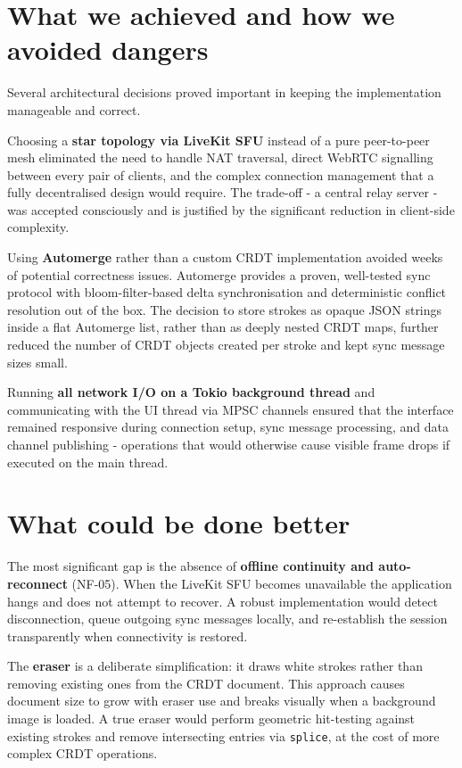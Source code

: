 \documentclass[a4paper,11pt,twoside]{report}
\theoremstyle{definition}
\begin{document}
\section{What we achieved and how we avoided dangers}

Several architectural decisions proved important in keeping the implementation manageable
and correct.

Choosing a \textbf{star topology via LiveKit SFU} instead of a pure peer-to-peer mesh
eliminated the need to handle NAT traversal, direct WebRTC signalling between every pair
of clients, and the complex connection management that a fully decentralised design would
require. The trade-off - a central relay server - was accepted consciously and is
justified by the significant reduction in client-side complexity.

Using \textbf{Automerge} rather than a custom CRDT implementation avoided weeks of
potential correctness issues. Automerge provides a proven, well-tested sync protocol with
bloom-filter-based delta synchronisation and deterministic conflict resolution out of the
box. The decision to store strokes as opaque JSON strings inside a flat Automerge list,
rather than as deeply nested CRDT maps, further reduced the number of CRDT objects
created per stroke and kept sync message sizes small.

Running \textbf{all network I/O on a Tokio background thread} and communicating with the
UI thread via MPSC channels ensured that the interface remained responsive during
connection setup, sync message processing, and data channel publishing - operations that
would otherwise cause visible frame drops if executed on the main thread.

\section{What could be done better}

The most significant gap is the absence of \textbf{offline continuity and auto-reconnect}
(NF-05). When the LiveKit SFU becomes unavailable the application hangs and does not
attempt to recover. A robust implementation would detect disconnection, queue outgoing
sync messages locally, and re-establish the session transparently when connectivity is
restored.

The \textbf{eraser} is a deliberate simplification: it draws white strokes rather than
removing existing ones from the CRDT document. This approach causes document size to grow
with eraser use and breaks visually when a background image is loaded. A true eraser would
perform geometric hit-testing against existing strokes and remove intersecting entries via
\texttt{splice}, at the cost of more complex CRDT operations.
\end{document}
